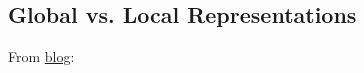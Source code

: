 \subsection{Global vs. Local Representations}
From \href{https://moalquraishi.wordpress.com/2019/04/01/the-future-of-protein-science-will-not-be-supervised/}{blog}:


